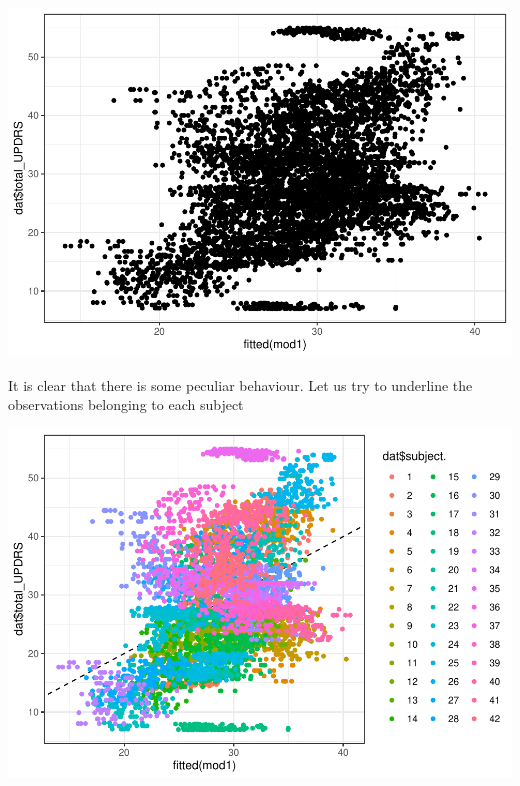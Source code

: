\documentclass[
]{article}
\newenvironment{Shaded}{\begin{snugshade}}{\end{snugshade}}
\newcommand{\AttributeTok}[1]{\textcolor[rgb]{0.13,0.29,0.53}{#1}}
\newcommand{\FunctionTok}[1]{\textcolor[rgb]{0.13,0.29,0.53}{\textbf{#1}}}
\newcommand{\NormalTok}[1]{#1}
\newcommand{\SpecialCharTok}[1]{\textcolor[rgb]{0.81,0.36,0.00}{\textbf{#1}}}
\newcommand{\StringTok}[1]{\textcolor[rgb]{0.31,0.60,0.02}{#1}}
\begin{document}
\includegraphics{Regression_files/figure-latex/unnamed-chunk-6-1.pdf}

It is clear that there is some peculiar behaviour. Let us try to
underline the observations belonging to each subject

\begin{Shaded}
\end{Shaded}

\includegraphics{Regression_files/figure-latex/unnamed-chunk-7-1.pdf}
\end{document}
